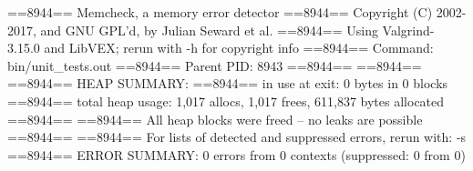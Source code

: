 ==8944== Memcheck, a memory error detector
==8944== Copyright (C) 2002-2017, and GNU GPL'd, by Julian Seward et al.
==8944== Using Valgrind-3.15.0 and LibVEX; rerun with -h for copyright info
==8944== Command: bin/unit_tests.out
==8944== Parent PID: 8943
==8944== 
==8944== 
==8944== HEAP SUMMARY:
==8944==     in use at exit: 0 bytes in 0 blocks
==8944==   total heap usage: 1,017 allocs, 1,017 frees, 611,837 bytes allocated
==8944== 
==8944== All heap blocks were freed -- no leaks are possible
==8944== 
==8944== For lists of detected and suppressed errors, rerun with: -s
==8944== ERROR SUMMARY: 0 errors from 0 contexts (suppressed: 0 from 0)
